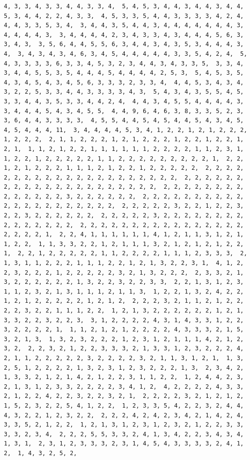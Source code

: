 \documentclass[
]{article}
\begin{document}
\begin{verbatim}
4, 3, 3, 4, 3, 3, 4, 4, 3, 3, 4,  5, 4, 5, 3, 4, 4, 3, 4, 4, 3, 4, 4, 5, 3, 4, 4, 2, 2, 4, 3, 3,  4, 5, 3, 3, 5, 4, 4, 3, 3, 3, 3, 4, 2, 4, 4, 4, 3, 3, 5, 3, 4,  3, 4, 4, 3, 5, 4, 4, 3, 4, 4, 4, 4, 4, 4, 4, 3, 4, 4, 4, 4, 3,  3, 4, 4, 4, 4, 2, 3, 4, 3, 3, 4, 3, 4, 4, 4, 5, 6, 3, 3, 4, 3,  3, 5, 6, 4, 4, 5, 5, 6, 3, 4, 4, 3, 4, 3, 5, 3, 4, 4, 4, 3, 4,  3, 4, 3, 4, 3, 4, 6, 3, 4, 5, 4, 4, 4, 4, 4, 3, 3, 5, 4, 2, 4,  5, 4, 3, 3, 3, 3, 6, 3, 3, 4, 5, 3, 2, 3, 4, 4, 3, 4, 3, 3, 5,  3, 3, 4, 3, 4, 4, 5, 5, 3, 5, 4, 4, 4, 5, 4, 4, 4, 4, 2, 5, 3,  5, 4, 5, 3, 5, 4, 3, 4, 5, 4, 3, 4, 5, 6, 3, 3, 3, 2, 3, 3, 4,  4, 4, 5, 3, 4, 3, 4, 3, 2, 2, 5, 3, 3, 4, 4, 3, 3, 3, 3, 4, 3,  5, 4, 3, 4, 3, 5, 5, 4, 5, 3, 3, 4, 4, 3, 5, 3, 3, 4, 4, 2, 4,  4, 4, 3, 4, 5, 5, 4, 4, 4, 4, 3, 3, 4, 4, 4, 5, 4, 3, 4, 5, 5,  4, 4, 9, 6, 4, 6, 3, 8, 3, 3, 5, 2, 3, 3, 6, 4, 4, 3, 3, 3, 3,  4, 5, 5, 4, 4, 5, 4, 5, 4, 4, 5, 4, 3, 4, 5, 4, 5, 4, 4, 4, 11,  3, 4, 4, 4, 4, 5, 3, 4, 1, 2, 2, 1, 2, 1, 2, 2, 2, 1, 2, 2, 2,  2, 1, 1, 2, 2, 2, 1, 2, 1, 2, 2, 2, 1, 2, 2, 1, 2, 2, 1, 2, 1,  1, 1, 2, 1, 2, 2, 1, 1, 1, 1, 1, 1, 2, 2, 2, 2, 1, 1, 2, 3, 1,  1, 2, 2, 1, 2, 2, 2, 2, 2, 1, 1, 2, 2, 2, 2, 2, 2, 2, 2, 2, 1,  2, 2, 1, 2, 1, 2, 2, 2, 1, 1, 1, 2, 1, 2, 2, 1, 2, 2, 2, 2, 2,  2, 2, 2, 2, 2, 2, 2, 2, 2, 2, 2, 2, 2, 2, 2, 2, 2, 2, 2, 2, 2,  2, 2, 2, 2, 2, 2, 2, 2, 2, 2, 2, 2, 2, 2, 2, 2, 2, 2, 2, 2, 2,  2, 2, 2, 2, 2, 2, 2, 2, 2, 2, 2, 2, 2, 2, 3, 2, 2, 2, 2, 2, 2,  2, 2, 2, 2, 2, 2, 2, 2, 2, 2, 2, 2, 2, 2, 2, 2, 2, 2, 2, 2, 2,  2, 2, 2, 2, 2, 3, 2, 2, 1, 2, 2, 3, 2, 2, 3, 2, 2, 2, 2, 2, 2,  2, 2, 2, 2, 2, 3, 2, 2, 2, 2, 2, 2, 2, 2, 2, 2, 2, 2, 2, 2, 2,  2, 2, 2, 2, 2, 2, 2, 2, 2, 2, 2, 2, 2, 2, 2, 2, 2, 2, 2, 2, 1,  2, 2, 4, 1, 1, 1, 1, 1, 1, 4, 1, 2, 1, 1, 3, 1, 2, 1, 1, 2, 2,  1, 1, 3, 3, 2, 2, 1, 2, 1, 1, 1, 3, 2, 1, 2, 1, 2, 1, 2, 2, 1,  2, 2, 1, 2, 2, 2, 2, 2, 1, 1, 2, 2, 2, 2, 1, 1, 1, 2, 3, 3, 3,  2, 1, 3, 1, 1, 2, 2, 2, 1, 1, 1, 2, 2, 1, 2, 1, 3, 2, 2, 3, 1,  4, 1, 2, 2, 3, 2, 2, 2, 1, 2, 2, 2, 2, 2, 3, 2, 1, 3, 2, 2, 2,  2, 3, 3, 2, 1, 3, 2, 2, 2, 2, 2, 2, 1, 3, 2, 2, 3, 2, 2, 3, 3,  2, 2, 1, 3, 1, 2, 3, 1, 1, 2, 3, 2, 1, 3, 1, 1, 1, 2, 1, 1, 3,  1, 2, 2, 1, 3, 2, 4, 2, 2, 1, 2, 1, 2, 2, 2, 2, 2, 1, 2, 1, 2,  2, 2, 2, 3, 2, 1, 1, 2, 1, 2, 2, 2, 2, 3, 2, 2, 1, 1, 1, 2, 2,  1, 2, 1, 3, 2, 2, 2, 2, 2, 2, 1, 2, 1, 3, 3, 2, 2, 3, 2, 2, 3,  3, 1, 2, 2, 2, 2, 4, 3, 1, 4, 3, 3, 1, 2, 2, 3, 2, 2, 2, 2, 1,  1, 1, 2, 1, 2, 1, 2, 2, 2, 2, 4, 3, 3, 3, 2, 1, 5, 3, 2, 1, 3,  1, 3, 2, 3, 2, 2, 2, 1, 2, 3, 1, 2, 1, 1, 1, 4, 2, 1, 2, 3, 2,  2, 2, 3, 2, 1, 2, 2, 3, 3, 3, 2, 1, 3, 3, 1, 2, 3, 2, 2, 2, 4,  2, 1, 1, 2, 2, 2, 2, 2, 3, 2, 2, 2, 2, 3, 2, 1, 1, 3, 1, 2, 1,  1, 3, 2, 5, 1, 2, 2, 2, 2, 1, 3, 2, 3, 1, 2, 3, 2, 2, 2, 1, 3,  2, 3, 4, 2, 1, 3, 3, 2, 1, 2, 1, 4, 2, 1, 2, 2, 3, 1, 1, 2, 2,  1, 2, 4, 4, 2, 3, 2, 1, 3, 1, 2, 3, 3, 2, 2, 2, 2, 3, 4, 1, 2,  4, 2, 2, 2, 2, 4, 3, 3, 2, 1, 2, 2, 4, 2, 2, 3, 2, 2, 3, 2, 1,  2, 2, 2, 2, 3, 2, 1, 2, 1, 2, 1, 5, 2, 3, 2, 2, 5, 4, 1, 2, 2,  1, 2, 3, 3, 5, 4, 2, 2, 3, 2, 4, 4, 4, 3, 2, 2, 1, 2, 3, 2, 2,  2, 2, 2, 4, 2, 4, 2, 3, 4, 2, 1, 4, 2, 4, 3, 3, 5, 2, 1, 2, 2,  1, 2, 1, 3, 1, 2, 3, 1, 2, 3, 2, 1, 2, 2, 3, 3, 3, 3, 2, 3, 4,  2, 2, 2, 5, 5, 3, 3, 2, 4, 1, 3, 4, 2, 2, 3, 4, 3, 4, 1, 3, 1,  2, 3, 1, 2, 3, 3, 3, 2, 3, 1, 4, 5, 4, 3, 3, 3, 3, 2, 4, 1, 2,  1, 4, 3, 2, 5, 2, 
\end{verbatim}
\end{document}
